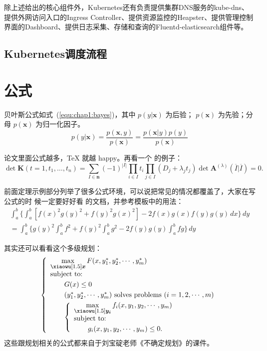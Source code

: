 除上述给出的核心组件外，Kubernetes还有负责提供集群DNS服务的kube-dns、提供外网访问入口的Ingress Controller、提供资源监控的Heapster、提供管理控制界面的Dashboard、提供日志采集、存储和查询的Fluentd-elasticsearch组件等。

\subsection{Kubernetes调度流程}

\section{公式}
\label{sec:equation}
贝叶斯公式如式~(\ref{equ:chap1:bayes})，其中 $p(y|\mathbf{x})$ 为后验；
$p(\mathbf{x})$ 为先验；分母 $p(\mathbf{x})$ 为归一化因子。
\begin{equation}
\label{equ:chap1:bayes}
p(y|\mathbf{x}) = \frac{p(\mathbf{x},y)}{p(\mathbf{x})}=
\frac{p(\mathbf{x}|y)p(y)}{p(\mathbf{x})} 
\end{equation}

论文里面公式越多，\TeX{} 就越 happy。再看一个  的例子：
\newcommand{\envert}[1]{\left\lvert#1\right\rvert} 
\begin{equation}\label{detK2}
\det\mathbf{K}(t=1,t_1,\dots,t_n)=\sum_{I\in\mathbf{n}}(-1)^{\envert{I}}
\prod_{i\in I}t_i\prod_{j\in I}(D_j+\lambda_jt_j)\det\mathbf{A}
^{(\lambda)}(\overline{I}|\overline{I})=0.
\end{equation} 

前面定理示例部分列举了很多公式环境，可以说把常见的情况都覆盖了，大家在写公式的时
候一定要好好看  的文档，并参考模板中的用法：
\begin{multline*}%
\int_a^b\biggl\{\int_a^b[f(x)^2g(y)^2+f(y)^2g(x)^2]
 -2f(x)g(x)f(y)g(y)\,dx\biggr\}\,dy \\
 =\int_a^b\biggl\{g(y)^2\int_a^bf^2+f(y)^2
  \int_a^b g^2-2f(y)g(y)\int_a^b fg\biggr\}\,dy
\end{multline*}

其实还可以看看这个多级规划：
\begin{equation}\label{bilevel}
\left\{\begin{array}{l}
\max\limits_{{\mbox{\footnotesize\boldmath $x$}}} F(x,y_1^*,y_2^*,\cdots,y_m^*)\\[0.2cm]
\mbox{subject to:}\\[0.1cm]
\qquad G(x)\le 0\\[0.1cm]
\qquad(y_1^*,y_2^*,\cdots,y_m^*)\mbox{ solves problems }(i=1,2,\cdots,m)\\[0.1cm]
\qquad\left\{\begin{array}{l}
    \max\limits_{{\mbox{\footnotesize\boldmath $y_i$}}}f_i(x,y_1,y_2,\cdots,y_m)\\[0.2cm]
    \mbox{subject to:}\\[0.1cm]
    \qquad g_i(x,y_1,y_2,\cdots,y_m)\le 0.
    \end{array}\right.
\end{array}\right.
\end{equation}
这些跟规划相关的公式都来自于刘宝碇老师《不确定规划》的课件。
